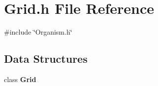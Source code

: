 \section{Grid.\+h File Reference}
\label{Grid_8h}
{\ttfamily \#include \char`\"{}Organism.\+h\char`\"{}}\newline
\subsection*{Data Structures}
\begin{DoxyCompactItemize}
\item 
class \textbf{ Grid}
\end{DoxyCompactItemize}
